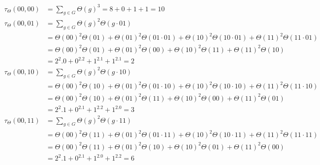 \scriptsize
\begin{align*}
    \tau_\Theta(00, 00)
    &= \sum_{g \in G} \Theta(g)^3
    = 8+0+1+1
    = 10 \\
    \tau_\Theta(00, 01)
    &=\sum_{g \in G} \Theta(g)^2\Theta(g \cdot 01) \\
    &= \Theta(00)^2\Theta(01)
        + \Theta(01)^2\Theta(01\cdot 01)
        + \Theta(10)^2\Theta(10\cdot 01)
        + \Theta(11)^2\Theta(11\cdot 01)\\
    &= \Theta(00)^2\Theta(01)
        + \Theta(01)^2\Theta(00)
        + \Theta(10)^2\Theta(11)
        + \Theta(11)^2\Theta(10)\\
    &= 2^2 .0 +0^2.2+1^2.1+1^2.1
    = 2 \\
    \tau_\Theta(00, 10)
    &=\sum_{g \in G} \Theta(g)^2\Theta(g \cdot 10) \\
    &= \Theta(00)^2\Theta(10)
        + \Theta(01)^2\Theta(01\cdot 10)
        + \Theta(10)^2\Theta(10\cdot 10)
        + \Theta(11)^2\Theta(11\cdot 10)\\
    &= \Theta(00)^2\Theta(10)
        + \Theta(01)^2\Theta(11)
        + \Theta(10)^2\Theta(00)
        + \Theta(11)^2\Theta(01)\\
    &= 2^2 .1 +0^2.1+1^2.2+1^2.0
    = 3 \\
    \tau_\Theta(00, 11)
    &= \sum_{g \in G} \Theta(g)^2\Theta(g \cdot 11) \\
    &= \Theta(00)^2\Theta(11)
        + \Theta(01)^2\Theta(01\cdot 11)
        + \Theta(10)^2\Theta(10\cdot 11)
        + \Theta(11)^2\Theta(11\cdot 11)\\
    &= \Theta(00)^2\Theta(11)
        + \Theta(01)^2\Theta(10)
        + \Theta(10)^2\Theta(01)
        + \Theta(11)^2\Theta(00)\\
    &= 2^2 .1 +0^2.1+1^2.0+1^2.2 = 6 \\

\end{align*}
